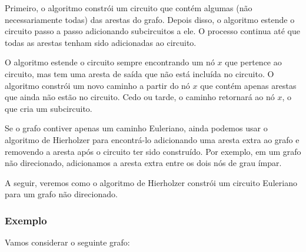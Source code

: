 Primeiro, o algoritmo constrói um circuito que contém
algumas (não necessariamente todas) das arestas do grafo.
Depois disso, o algoritmo estende o circuito
passo a passo adicionando subcircuitos a ele.
O processo continua até que todas as arestas tenham sido adicionadas
ao circuito.

O algoritmo estende o circuito sempre encontrando
um nó $x$ que pertence ao circuito, mas tem
uma aresta de saída que não está incluída no circuito.
O algoritmo constrói um novo caminho a partir do nó $x$
que contém apenas arestas que ainda não estão no circuito.
Cedo ou tarde,
o caminho retornará ao nó $x$,
o que cria um subcircuito.

Se o grafo contiver apenas um caminho Euleriano,
ainda podemos usar o algoritmo de Hierholzer
para encontrá-lo adicionando uma aresta extra ao grafo
e removendo a aresta após o circuito
ter sido construído.
Por exemplo, em um grafo não direcionado,
adicionamos a aresta extra entre os dois
nós de grau ímpar.

A seguir, veremos como o algoritmo de Hierholzer
constrói um circuito Euleriano para um grafo não direcionado.

\subsubsection{Exemplo}

\begin{samepage}
Vamos considerar o seguinte grafo:
\begin{center}
\end{center}
\end{samepage}

